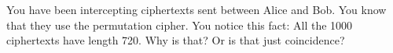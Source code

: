   You have been intercepting ciphertexts sent between Alice and Bob.
  You know that they use the permutation cipher.
  You notice this fact: All the 1000 ciphertexts have length 720.
  Why is that?
  Or is that just coincidence?

